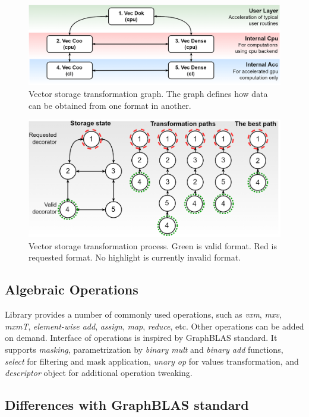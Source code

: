 \begin{figure}[]
\centering
\includegraphics[width=0.9\linewidth]{figures/storage_transformation_graph.png}
\caption{Vector storage transformation graph. The graph defines how data can be obtained from one format in another.}
\label{fig:vec_tsf}
\end{figure}

\begin{figure}[]
\centering
\includegraphics[width=0.9\linewidth]{figures/storage_transformation.png}
\caption{Vector storage transformation process. Green is valid format. Red is requested format. No highlight is currently invalid format.}
\label{fig:vec_exmp}
\end{figure}

\subsection{Algebraic Operations}

Library provides a number of commonly used operations, such as \textit{vxm}, \textit{mxv}, \textit{mxmT}, \textit{element-wise add}, \textit{assign}, \textit{map}, \textit{reduce}, etc.
Other operations can be added on demand.
Interface of operations is inspired by GraphBLAS standard. 
It supports \textit{masking}, parametrization by \textit{binary mult} and \textit{binary add} functions, \textit{select} for filtering and mask application, \textit{unary op} for values transformation, and \textit{descriptor} object for additional operation tweaking.

\subsection{Differences with GraphBLAS standard}

